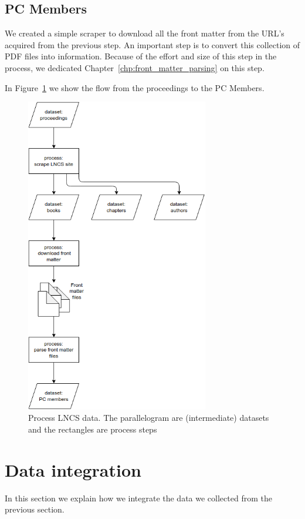 \documentclass{ou-report}
\newcommand{\lncs}{LNCS}
\begin{document}
\subsection{PC Members}
We created a simple scraper to download all the front matter from the URL's 
acquired from the previous step. An important step is to convert this collection
of PDF files into information. Because of the effort and size of this step in
the process, we dedicated Chapter~\ref{chp:front_matter_parsing} on this 
step.

In Figure~\ref{fig:flow_proceedings_dataset} we show the flow from the proceedings
to the PC Members.

\begin{figure}[H]
    \centering
    \includegraphics[width=8cm]{images/data_integration/lncs.png}
    \caption{Process \lncs{} data. The parallelogram are (intermediate) datasets 
    and the rectangles are process steps}
    \label{fig:flow_proceedings_dataset}
\end{figure}



\section{Data integration}
In this section we explain how we integrate the data we collected from the
previous section. 
\end{document}
